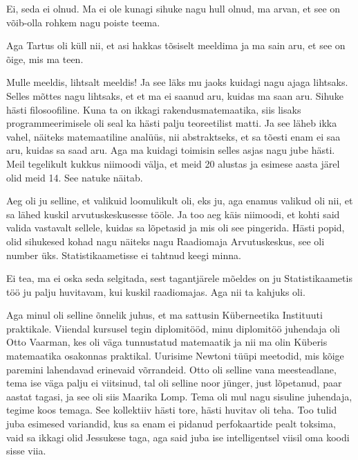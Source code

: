 
Ei, seda ei olnud. Ma ei ole kunagi sihuke nagu hull olnud, ma arvan, et see on 
võib-olla rohkem nagu poiste teema. 


Aga Tartus oli küll nii, et asi hakkas tõsiselt meeldima ja ma sain aru, et see 
on õige, mis ma teen. 


Mulle meeldis, lihtsalt meeldis! Ja see läks mu jaoks kuidagi nagu ajaga 
lihtsaks. Selles mõttes nagu lihtsaks, et et ma ei saanud aru, kuidas ma saan 
aru. Sihuke hästi filosoofiline. Kuna ta on ikkagi rakendusmatemaatika, siis 
lisaks  programmeerimisele oli seal ka hästi palju teoreetilist matti. Ja see 
läheb ikka vahel, näiteks matemaatiline analüüs, nii  abstraktseks, et sa 
tõesti enam ei saa aru, kuidas sa saad aru. Aga ma kuidagi toimisin selles 
asjas nagu jube hästi. Meil tegelikult kukkus niimoodi välja, et  meid  20 
alustas ja esimese aasta järel olid meid 14. See natuke näitab. 


Aeg oli ju selline, et valikuid loomulikult oli, eks ju, aga enamus valikud oli 
nii, et sa lähed kuskil arvutuskeskusesse tööle. Ja too aeg käis  niimoodi, et 
kohti said valida vastavalt sellele, kuidas sa lõpetasid ja mis oli see 
pingerida. Hästi popid, olid sihukesed kohad nagu näiteks nagu Raadiomaja 
Arvutuskeskus, see oli number üks. 
Statistikaametisse ei tahtnud keegi minna.


Ei tea, ma ei oska seda selgitada, sest tagantjärele mõeldes on ju 
Statistikaametis töö ju palju huvitavam, kui kuskil raadiomajas. Aga nii ta 
kahjuks oli.

Aga minul oli selline õnnelik juhus, et ma sattusin Küberneetika 
Instituuti  praktikale. Viiendal kursusel tegin 
diplomitööd, minu diplomitöö juhendaja oli Otto Vaarman, kes oli väga tunnustatud matemaatik ja nii ma olin Küberis matemaatika 
osakonnas praktikal. Uurisime  Newtoni tüüpi meetodid, mis kõige paremini 
lahendavad erinevaid võrrandeid. Otto oli selline vana meesteadlane, tema ise 
väga palju ei viitsinud, tal oli selline noor jünger, just lõpetanud, paar 
aastat tagasi, ja see oli siis Maarika Lomp. Tema oli 
mul nagu sisuline juhendaja, tegime koos temaga. See kollektiiv hästi tore, 
hästi huvitav oli teha. Too tulid juba esimesed variandid, kus sa enam ei 
pidanud perfokaartide pealt toksima, vaid sa ikkagi olid 
Jessukese taga, aga said juba ise intelligentsel viisil oma 
koodi  sisse viia. 

